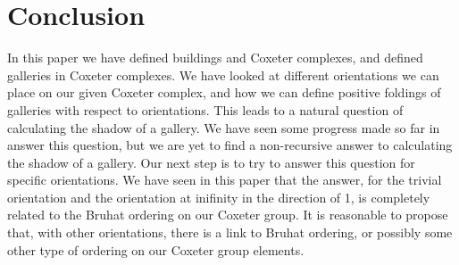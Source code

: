 \documentclass[11pt]{article}
\begin{document}
\section{Conclusion}

In this paper we have defined buildings and Coxeter complexes, and defined galleries in Coxeter complexes. We have looked at different orientations we can place on our given Coxeter complex, and how we can define positive foldings of galleries with respect to orientations. This leads to a natural question of calculating the shadow of a gallery. We have seen some progress made so far in answer this question, but we are yet to find a non-recursive answer to calculating the shadow of a gallery. Our next step is to try to answer this question for specific orientations. We have seen in this paper that the answer, for the trivial orientation and the orientation at inifinity in the direction of 1, is completely related to the Bruhat ordering on our Coxeter group. It is reasonable to propose that, with other orientations, there is a link to Bruhat ordering, or possibly some other type of ordering on our Coxeter group elements. 

\newpage


\end{document}
